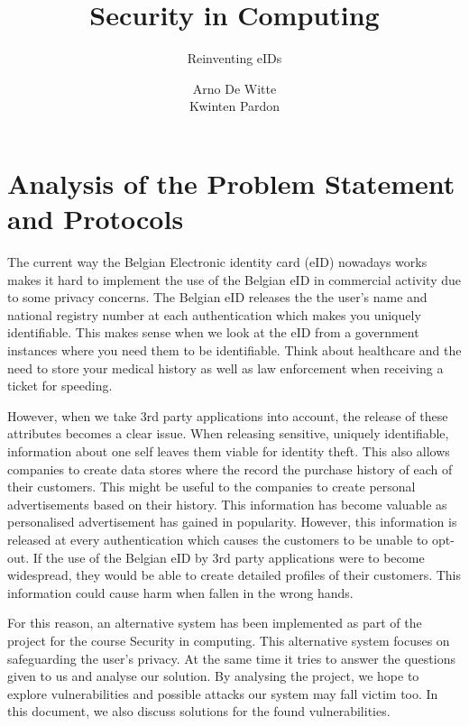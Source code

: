 \documentclass[12pt]{report}
\begin{document}
\title{Security in Computing}
\subtitle{Reinventing eIDs}
\author{Arno De Witte \\Kwinten Pardon}

\maketitle


\section{Analysis of the Problem Statement and Protocols}
The current way the Belgian Electronic identity card (eID) nowadays works makes it hard to implement the use of the Belgian eID in commercial activity due to some privacy concerns. The Belgian eID releases the the user's name and national registry number at each authentication which makes you uniquely identifiable. This makes sense when we look at the eID from a government instances where you need them to be identifiable. Think about healthcare and the need to store your medical history as well as law enforcement when receiving a ticket for speeding.

However, when we take 3rd party applications into account, the release of these attributes becomes a clear issue. When releasing sensitive, uniquely identifiable, information about one self leaves them viable for identity theft. This also allows companies to create data stores where the record the purchase history of each of their customers. This might be useful to the companies to create personal advertisements based on their history. This information has become valuable as personalised advertisement has gained in popularity. However, this information is released at every authentication which causes the customers to be unable to opt-out. If the use of the Belgian eID by 3rd party applications were to become widespread, they would be able to create detailed profiles of their customers. This information could cause harm when fallen in the wrong hands.

For this reason, an alternative system has been implemented as part of the project for the course Security in computing. This alternative system focuses on safeguarding the user's privacy. At the same time it tries to answer the questions given to us and analyse our solution. By analysing the project, we hope to explore vulnerabilities and possible attacks our system may fall victim too. In this document, we also discuss solutions for the found vulnerabilities.
\end{document}
